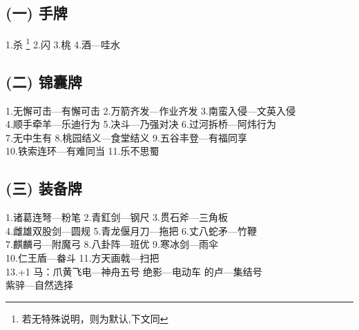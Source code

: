 \documentclass[UTF-8]{ctexart}
\begin{document}
\subsection*{(一)   手牌}

\begin{flushleft}
1.杀 \footnote{若无特殊说明，则为默认,下文同}  \hspace{1.0cm} 2.闪 \hspace{1.0cm} 3.桃 \hspace{1.0cm} 4.酒---哇水
\end{flushleft}

\subsection*{(二)   锦囊牌}

\begin{flushleft}
1.无懈可击---有懈可击 \hspace{0.2cm} 2.万箭齐发---作业齐发 \hspace{0.2cm} 3.南蛮入侵---文英入侵\\
4.顺手牵羊---乐迪行为 \hspace{0.22cm} 5.决斗---乃强对决 \hspace{1cm} 6.过河拆桥---阿炜行为\\
7.无中生有 \hspace{2.05cm} 8.桃园结义---食堂结义 \hspace{0.2cm} 9.五谷丰登---有福同享\\
10.铁索连环---有难同当 \hspace{0.1cm} 11.乐不思蜀
\end{flushleft}

\subsection*{(三)   装备牌}

\begin{flushleft}
1.诸葛连弩---粉笔 \hspace{0.8cm} 2.青釭剑---钢尺 \hspace{1.5cm} 3.贯石斧---三角板\\
4.雌雄双股剑---圆规 \hspace{0.4cm} 5.青龙偃月刀---拖把 \hspace{0.8cm} 6.丈八蛇矛---竹鞭\\
7.麒麟弓---附魔弓 \hspace{0.8cm} 8.八卦阵---班优 \hspace{1.5cm} 9.寒冰剑---雨伞\\
10.仁王盾---畚斗 \hspace{1cm} 11.方天画戟---扫把\\
13.+1 马：爪黄飞电---神舟五号 \hspace{0.1cm} 绝影---电动车 \hspace{0.1cm} 的卢---集结号\\
紫骍---自然选择
\end{flushleft}
\end{document}
